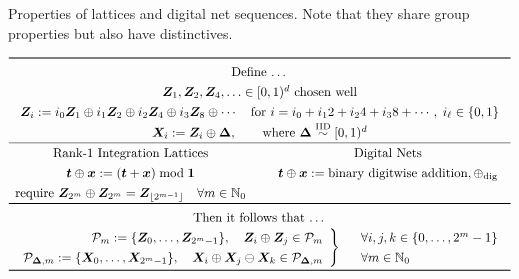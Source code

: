 \documentclass[graybox,footinfo]{svmult}
\newcommand{\IID}{\textup{IID}}
\newcommand{\IIDsim}{\overset{\IID}{\sim}}
\newcommand{\dig}{\textup{dig}}
\begin{document}
\begin{table}[h]
	\centering
	\caption{Properties of lattices and digital net sequences.  Note that they share group properties but also have distinctives.} \label{tab:GroupProp}
\[
	\renewcommand{\arraystretch}{1.3}
\begin{array}{c@{\qquad}c}
	\toprule
	\multicolumn{2}{c}{\text{Define \ldots}} \\
	\multicolumn{2}{c}{\bsZ_1, \bsZ_2, \bsZ_4, \ldots \in [0,1)^d \text{ chosen well} } \\
	\multicolumn{2}{c}{
	\bsZ_{i} := i_0  \bsZ_1 \oplus i_1 \bsZ_{2} \oplus i_2  \bsZ_{4} \oplus  i_3  \bsZ_{8} \oplus \cdots 
	\quad
	\text{for }i = i_0 +i_1 2 + i_2 4 + i_3 8 + \cdots, \; i_\ell \in \{0,1\}} \\
    \multicolumn{2}{c}{\bsX_i := \bsZ_i \oplus \bsDelta, \qquad \text{where }\bsDelta \IIDsim [0,1)^d} \\  \hline
	\text{Rank-1 Integration Lattices} & \text{Digital Nets} \\
		\bst \oplus \bsx : = (\bst + \bsx) \bmod \bsone & \bst \oplus \bsx := \text{binary digitwise addition}, \oplus_{\dig} \\ 
		\text{require } \bsZ_{2^{m}} \oplus \bsZ_{2^{m}} = \bsZ_{\lfloor2^{m-1}\rfloor}
		\quad \forall m \in \bbN_0 
		\\
\toprule
\multicolumn{2}{c}{\text{Then it follows that \ldots}} \\
	\multicolumn{2}{c}{\left . \begin{array}{r}
			\calP_m := \{\bsZ_0, \ldots, \bsZ_{2^m-1}\}, \quad
			\bsZ_i \oplus \bsZ_j \in \calP_m \\
			\calP_{\bsDelta,m} := \{\bsX_0, \ldots, \bsX_{2^m-1}\}, \quad
			\bsX_i \oplus \bsX_j \ominus \bsX_k \in \calP_{\bsDelta,m}
	\end{array} \right \}\quad \begin{array}{l}\forall  i,j,k \in \{0, \ldots, 2^{m} -1\} \\ \forall m \in \bbN_0\end{array}} \\
\bottomrule
\end{array}
\]
\end{table}
\end{document}

